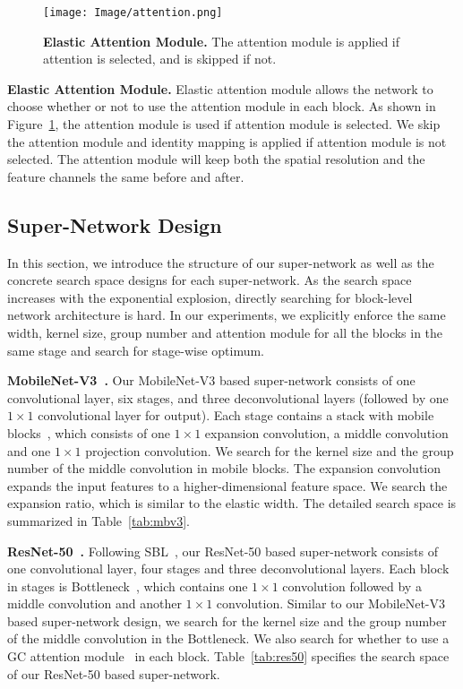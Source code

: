 \documentclass[final]{cvpr}
\begin{document}
\begin{figure}[tb]
	\centering
	\texttt{[image: Image/attention.png]}
	\caption{\textbf{Elastic Attention Module.} The attention module is applied if attention is selected, and is skipped if not.}
	\label{fig:attention}
	\vspace{10pt}
\end{figure}


\textbf{Elastic Attention Module.}
Elastic attention module allows the network to choose whether or not to use the attention module in each block. As shown in Figure~\ref{fig:attention}, the attention module is used if attention module is selected. We skip the attention module and identity mapping is applied if attention module is not selected. The attention module will keep both the spatial resolution and the feature channels the same before and after.

\subsection{Super-Network Design}
\label{sec:supp_supernetwork}
In this section, we introduce the structure of our super-network as well as the concrete search space designs for each super-network. As the search space increases with the exponential explosion, directly searching for block-level network architecture is hard. In our experiments, we explicitly enforce the same width, kernel size, group number and attention module for all the blocks in the same stage and search for stage-wise optimum.

\textbf{MobileNet-V3~\cite{howard2019searching}.}
Our MobileNet-V3 based super-network consists of one convolutional layer, six stages, and three deconvolutional layers (followed by one $1\times1$ convolutional layer for output). Each stage contains a stack with mobile blocks~\cite{howard2019searching}, which consists of one $1\times1$ expansion convolution, a middle convolution and one $1\times1$ projection convolution. We search for the kernel size and the group number of the middle convolution in mobile blocks. The expansion convolution expands the input features to a higher-dimensional feature space. We search the expansion ratio, which is similar to the elastic width. The detailed search space is summarized in Table~\ref{tab:mbv3}.

\textbf{ResNet-50~\cite{he2016deep}.}
Following SBL~\cite{xiao2018simple}, our ResNet-50 based super-network consists of one convolutional layer, four stages and three deconvolutional layers. Each block in stages is Bottleneck~\cite{he2016deep}, which contains one $1\times1$ convolution followed by a middle convolution and another $1\times1$ convolution. Similar to our MobileNet-V3 based super-network design, we search for the kernel size and the group number of the middle convolution in the Bottleneck. We also search for whether to use a GC attention module~\cite{cao2019gcnet} in each block. Table~\ref{tab:res50} specifies the search space of our ResNet-50 based super-network.
\end{document}
